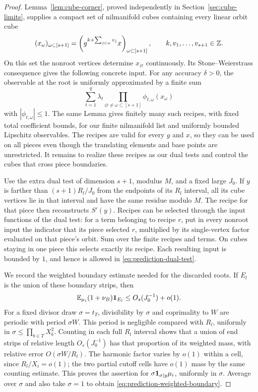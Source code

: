 \begin{proof}
Lemma~\ref{lem:cube-corner}, proved independently in
Section~\ref{sec:cube-limits}, supplies a compact set of nilmanifold
cubes containing every linear orbit cube
\[
 (x_\omega)_{\omega\subset[s+1]}
   =\left(g^{k+\sum_{j\in\omega}v_j}x\right)_{\omega\subset[s+1]},
 \qquad k,v_1,\ldots,v_{s+1}\in\mathbb Z.
\]
On this set the nonroot vertices determine $x_\varnothing$
continuously.  Its Stone--Weierstrass consequence gives the following
concrete input.  For any accuracy $\delta>0$, the observable at the
root is uniformly approximated by a finite sum
\[
 \sum_{t=1}^{q}\lambda_t
 \prod_{\varnothing\ne\omega\subset[s+1]}\phi_{t,\omega}(x_\omega)
\]
with $|\phi_{t,\omega}|\leq1$.  The same Lemma gives finitely many
such recipes, with fixed total coefficient bounds, for our finite
nilmanifold list and uniformly bounded Lipschitz observables.
The recipes are valid for every $g$ and $x$, so they can be used on
all pieces even though the translating elements and base points are
unrestricted.  It remains to realize these recipes as our dual tests
and control the cubes that cross piece boundaries.

Use the extra dual test of dimension $s+1$, modulus $M$, and a fixed
large $J_0$.  If $y$ is farther than $(s+1)R_l/J_0$ from the endpoints
of its $R_l$ interval, all its cube vertices lie in that interval and
have the same residue modulo $M$.  The recipe for that piece then
reconstructs $S'(y)$.  Recipes can be selected through the input
functions of the dual test: for a term belonging to recipe $r$, put
in every nonroot input the indicator that its piece selected $r$,
multiplied by its single-vertex factor evaluated on that piece's
orbit.  Sum over the finite recipes and terms.  On cubes staying in
one piece this selects exactly its recipe.  Each resulting input is
bounded by $1$, and hence is allowed in
\eqref{eq:prediction-dual-test}.

We record the weighted boundary estimate needed for the discarded
roots.  If $E_l$ is the union of these boundary strips, then
\begin{equation}\label{eq:prediction-weighted-boundary}
 \mathbb E_{\mu_i}(1+\nu_B)\mathbf 1_{E_l}
 \leq O_s(J_0^{-1})+o(1).
\end{equation}
For a fixed divisor draw $\sigma=t_T$, divisibility by $\sigma$
and coprimality to $W$ are periodic with period $\sigma W$.
This period is negligible compared with $R_l$, uniformly in
$\sigma\leq\prod_{b\in T}X_b^2$.  Counting in each full $R_l$ interval
shows that a union of end strips of relative length $O_s(J_0^{-1})$
has that proportion of its weighted mass, with relative error
$O(\sigma W/R_l)$.  The harmonic factor varies by $o(1)$ within a
cell, since $R_l/X_i=o(1)$; the two partial cutoff cells have $o(1)$
mass by the same counting estimate.  This proves the assertion for
$\sigma\mathbf 1_{\sigma\mid y}\mu_i$, uniformly in $\sigma$.
Average over $\sigma$ and also take $\sigma=1$ to obtain
\eqref{eq:prediction-weighted-boundary}.


\end{proof}

